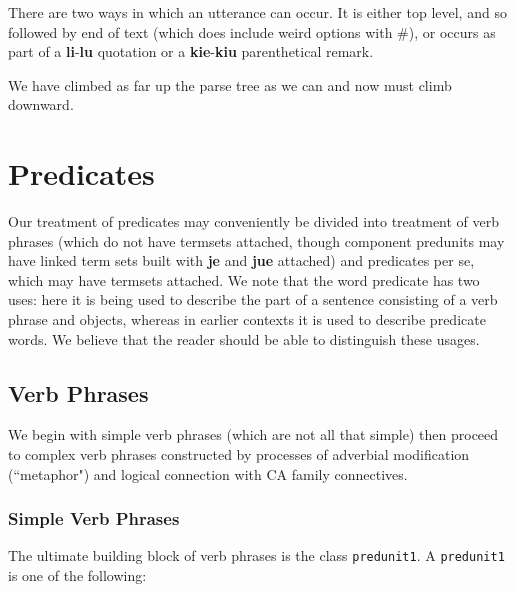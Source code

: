 \documentclass[12pt]{book}
\begin{document}
There are two ways in which an utterance can occur.  It is either top level, and so followed by end of text (which does include weird options with \#), or occurs as part of a {\bf li}-{\bf lu} quotation or a {\bf kie}-{\bf kiu} parenthetical remark.

We have climbed as far up the parse tree as we can and now must climb downward.

\newpage

\section{Predicates}

Our treatment of predicates may conveniently be divided into treatment of verb phrases (which do not have termsets attached, though component predunits may have linked term sets built with {\bf je} and {\bf jue} attached) and predicates per se, which may have termsets attached.  We note that the word predicate has two uses:  here it is being used to describe the part of a sentence consisting of a verb phrase and objects, whereas in earlier contexts it is used to describe predicate words.  We believe that the reader should be able to distinguish these usages.

\subsection{Verb Phrases}

We begin with simple verb phrases (which are not all that simple) then proceed to complex verb phrases constructed by processes of
adverbial modification (``metaphor") and logical connection with CA family connectives.

\subsubsection{Simple Verb Phrases}

The ultimate building block of verb phrases is the class {\tt predunit1}.  A {\tt predunit1} is one of the following:
\end{document}
